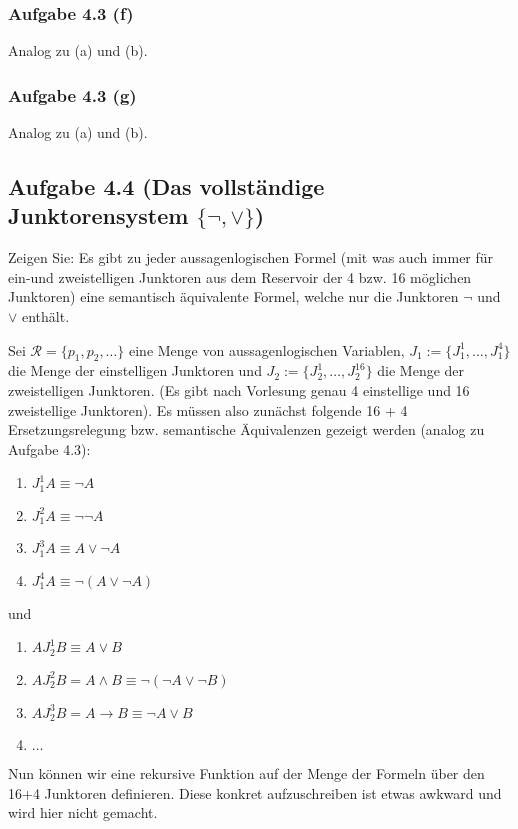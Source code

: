 \subsubsection{Aufgabe 4.3 (f)}
Analog zu (a) und (b).

\subsubsection{Aufgabe 4.3 (g)}
Analog zu (a) und (b).

\subsection{Aufgabe 4.4 (Das vollständige Junktorensystem \texorpdfstring{$\lbrace\neg, \vee\rbrace$}{lbrace neg,vee rbrace})}
Zeigen Sie: Es gibt zu jeder aussagenlogischen Formel (mit was auch immer für ein-und zweistelligen Junktoren aus dem Reservoir der 4 bzw. 16 möglichen Junktoren) eine
semantisch äquivalente Formel, welche nur die Junktoren $\neg$ und $\vee$ enthält.

\begin{lösung}
	Sei $\mathcal{R}=\lbrace p_1,p_2,\ldots\rbrace$ eine Menge von aussagenlogischen Variablen, 
	$J_1:=\lbrace J_1^1,\ldots,J_1^4\rbrace$ die Menge der einstelligen Junktoren und $J_2:=\lbrace J_2^1,\ldots,J_2^{16}\rbrace$ die Menge der zweistelligen Junktoren. 
	(Es gibt nach Vorlesung genau 4 einstellige und 16 zweistellige Junktoren). 
	Es müssen also zunächst folgende 16 + 4 Ersetzungsrelegung bzw. semantische Äquivalenzen gezeigt werden (analog zu Aufgabe 4.3):
	\begin{enumerate}
		\item $J_1^1 A\equiv\neg A$
		\item $J_1^2 A\equiv\neg\neg A$
		\item $J_1^3 A\equiv A\vee\neg A$
		\item $J_1^4 A\equiv\neg(A\vee\neg A)$
	\end{enumerate}
	und
	\begin{enumerate}
		\item $A J_2^1 B\equiv A\vee B$
		\item $A J_2^2 B=A\wedge B\equiv\neg(\neg A\vee\neg B)$
		\item $A J_2^3 B=A\to B\equiv\neg A\vee B$
		\item $\ldots$
	\end{enumerate}
	Nun können wir eine rekursive Funktion auf der Menge der Formeln über den 16+4 Junktoren definieren.
	Diese konkret aufzuschreiben ist etwas awkward und wird hier nicht gemacht.
\end{lösung}

